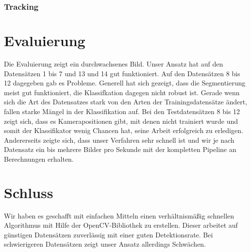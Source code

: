 \documentclass[conference]{IEEEtran}
\begin{document}
\subsubsection{Tracking}

\section{Evaluierung}

Die Evaluierung zeigt ein durchwachsenes Bild.
Unser Ansatz hat auf den Datensätzen 1 bis 7 und 13 und 14 gut funktioniert. Auf den Datensätzen 8 bis 12 dagegeben gab es Probleme. Generell hat sich gezeigt, dass die Segmentierung meist gut funktioniert, die Klassifkation dagegen nicht robust ist. Gerade wenn sich die Art des Datensatzes stark von den Arten der Trainingsdatensätze ändert, fallen starke Mängel in der Klassifikation auf. Bei den Testdatensätzen 8 bis 12 zeigt sich, dass es Kamerapositionen gibt, mit denen nicht trainiert wurde und somit der Klassifikator wenig Chancen hat, seine Arbeit erfolgreich zu erledigen.
Andererseits zeigte sich, dass unser Verfahren sehr schnell ist und wir je nach Datensatz ein bis mehrere Bilder pro Sekunde mit der kompletten Pipeline an Berechnungen erhalten.


\section{Schluss}

Wir haben es geschafft mit einfachen Mitteln einen verhältnismäßig schnellen Algorithmus mit Hilfe der OpenCV-Bibliothek zu erstellen. Dieser arbeitet auf günstigen Datensätzen zuverlässig mit einer guten Detektionsrate. Bei schwierigeren Datensätzen zeigt unser Ansatz allerdings Schwächen.
\end{document}
